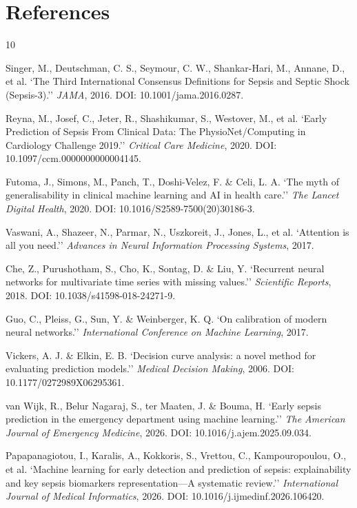 \documentclass[11pt,a4paper]{article}
\begin{document}
\clearpage

\section*{References}
\begin{thebibliography}{10}

Singer, M., Deutschman, C. S., Seymour, C. W., Shankar-Hari, M., Annane, D., et al. `The Third International Consensus Definitions for Sepsis and Septic Shock (Sepsis-3).'' \textit{JAMA}, 2016. DOI: 10.1001/jama.2016.0287.

Reyna, M., Josef, C., Jeter, R., Shashikumar, S., Westover, M., et al. `Early Prediction of Sepsis From Clinical Data: The PhysioNet/Computing in Cardiology Challenge 2019.'' \textit{Critical Care Medicine}, 2020. DOI: 10.1097/ccm.0000000000004145.

Futoma, J., Simons, M., Panch, T., Doshi-Velez, F. \& Celi, L. A. `The myth of generalisability in clinical machine learning and AI in health care.'' \textit{The Lancet Digital Health}, 2020. DOI: 10.1016/S2589-7500(20)30186-3.

Vaswani, A., Shazeer, N., Parmar, N., Uszkoreit, J., Jones, L., et al. `Attention is all you need.'' \textit{Advances in Neural Information Processing Systems}, 2017.

Che, Z., Purushotham, S., Cho, K., Sontag, D. \& Liu, Y. `Recurrent neural networks for multivariate time series with missing values.'' \textit{Scientific Reports}, 2018. DOI: 10.1038/s41598-018-24271-9.

Guo, C., Pleiss, G., Sun, Y. \& Weinberger, K. Q. `On calibration of modern neural networks.'' \textit{International Conference on Machine Learning}, 2017.

Vickers, A. J. \& Elkin, E. B. `Decision curve analysis: a novel method for evaluating prediction models.'' \textit{Medical Decision Making}, 2006. DOI: 10.1177/0272989X06295361.

van Wijk, R., Belur Nagaraj, S., ter Maaten, J. \& Bouma, H. `Early sepsis prediction in the emergency department using machine learning.'' \textit{The American Journal of Emergency Medicine}, 2026. DOI: 10.1016/j.ajem.2025.09.034.

Papapanagiotou, I., Karalis, A., Kokkoris, S., Vrettou, C., Kampouropoulou, O., et al. `Machine learning for early detection and prediction of sepsis: explainability and key sepsis biomarkers representation---A systematic review.'' \textit{International Journal of Medical Informatics}, 2026. DOI: 10.1016/j.ijmedinf.2026.106420.


\end{thebibliography}
\end{document}
